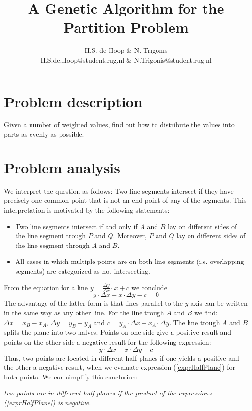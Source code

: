 \documentclass[a4paper,10pt]{article}
\title{A Genetic Algorithm for the Partition Problem}
\author{H.S. de Hoop \& N. Trigonis\\
        H.S.de.Hoop@student.rug.nl \& N.Trigonis@student.rug.nl}
\begin{document}
\maketitle

\section{Problem description}
Given a number of weighted values, find out how to distribute the values into parts as evenly as possible.
\section{Problem analysis}
We interpret the question as follows: Two line segments intersect if they have precisely one common point that is not an end-point of any of the segments.
This interpretation is motivated by the following statements:
\begin{itemize}
\item Two line segments intersect if and only if $A$ and $B$ lay on different sides of the line segment trough $P$ and $Q$. Moreover, $P$ and $Q$ lay on different sides of the line segment through $A$ and $B$.
\item All cases in which multiple points are on both line segments (i.e. overlapping segments) are categorized as not intersecting.
\end{itemize}
From the equation for a line $y = \frac{\Delta y}{\Delta x}\cdot x + c$ we conclude
$$ y\cdot \Delta x - x \cdot \Delta y - c = 0
$$ 
The advantage of the latter form is that lines parallel to the $y$-axis can be written in the same way as any other line.
For the line trough $A$ and $B$ we find: 
$\Delta x = x_B - x_A$, $\Delta y = y_B - y_A$ and $c = y_A \cdot \Delta x - x_A \cdot \Delta y$.
The line trough $A$ and $B$ splits the plane into two halves. Points on one side give a positive result and points on the other side a negative result for the following expression:
\begin{equation}\label{exprHalfPlane}
y \cdot \Delta x - x \cdot \Delta y - c
\end{equation}
Thus, two points are located in different half planes if one yields a positive and the other a negative result, when we evaluate expression (\ref{exprHalfPlane}) for both points.
We can simplify this conclusion: \\[2mm]
\centerline{\it two points are in different half planes if the product of the expressions (\ref{exprHalfPlane}) is negative.}
\end{document}
